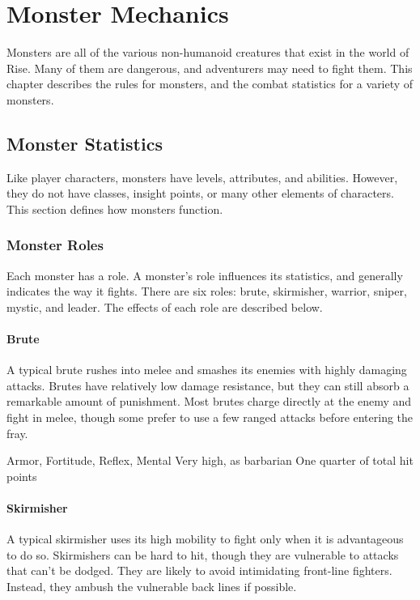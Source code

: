 \chapter{Monster Mechanics}

Monsters are all of the various non-humanoid creatures that exist in the world of Rise.
Many of them are dangerous, and adventurers may need to fight them.
This chapter describes the rules for monsters, and the combat statistics for a variety of monsters.

\section{Monster Statistics}
    Like player characters, monsters have levels, attributes, and abilities.
    However, they do not have classes, insight points, or many other elements of characters.
    This section defines how monsters function.

    \subsection{Monster Roles}
        Each monster has a role.
        A monster's role influences its statistics, and generally indicates the way it fights.
        There are six roles: brute, skirmisher, warrior, sniper, mystic, and leader.
        The effects of each role are described below.

        \subsubsection{Brute}
            A typical brute rushes into melee and smashes its enemies with highly damaging attacks.
            Brutes have relatively low damage resistance, but they can still absorb a remarkable amount of punishment.
            Most brutes charge directly at the enemy and fight in melee, though some prefer to use a few ranged attacks before entering the fray.

              Armor,  Fortitude,  Reflex,  Mental
             Very high, as barbarian
             One quarter of total hit points

        \subsubsection{Skirmisher}
            A typical skirmisher uses its high mobility to fight only when it is advantageous to do so.
            Skirmishers can be hard to hit, though they are vulnerable to attacks that can't be dodged.
            They are likely to avoid intimidating front-line fighters.
            Instead, they ambush the vulnerable back lines if possible.

